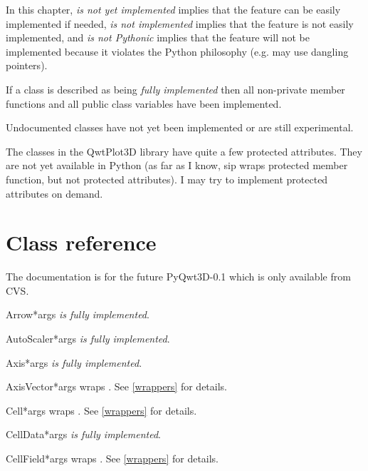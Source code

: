 \documentclass{manual}
\newcommand{\Future}{
  \begin{notice}[warning]
    The documentation is for the future PyQwt3D-0.1 which is only available
    from CVS.
  \end{notice}
}
\begin{document}
In this chapter, \emph{is not yet implemented} implies that the feature can
be easily implemented if needed, \emph{is not implemented} implies that the
feature is not easily implemented, and \emph{is not Pythonic} implies that
the feature will not be implemented because it violates the Python philosophy
(e.g. may use dangling pointers).

If a class is described as being \emph{fully implemented} then all non-private
member functions and all public class variables have been implemented.

Undocumented classes have not yet been implemented or are still experimental.

The classes in the QwtPlot3D library have quite a few protected attributes.
They are not yet available in Python (as far as I know, sip wraps protected
member function, but not protected attributes).
I may try to implement protected attributes on demand.


\section{Class reference \label{classes}}

\Future{}

\begin{classdesc}{Arrow}{*args}
\emph{is fully implemented}.
\end{classdesc}

\begin{classdesc}{AutoScaler}{*args}
\emph{is fully implemented}.
\end{classdesc}

\begin{classdesc}{Axis}{*args}
\emph{is fully implemented}.
\end{classdesc}

\begin{classdesc}{AxisVector}{*args}
wraps . See \ref{wrappers} for details.
\end{classdesc}

\begin{classdesc}{Cell}{*args}
wraps . See \ref{wrappers} for details.
\end{classdesc}

\begin{classdesc}{CellData}{*args}
\emph{is fully implemented}.
\end{classdesc}

\begin{classdesc}{CellField}{*args}
wraps . See \ref{wrappers} for details.
\end{classdesc}
\end{document}
